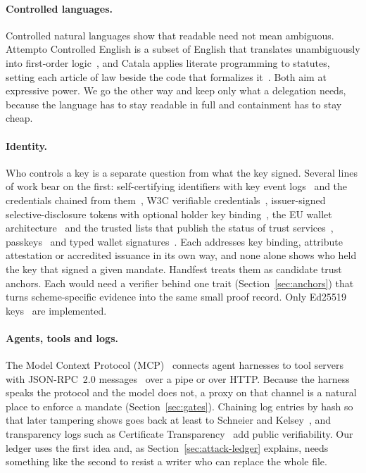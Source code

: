 \documentclass[10pt,twocolumn]{article}
\theoremstyle{plain}
\theoremstyle{definition}
\begin{document}
\paragraph{Controlled languages.}
Controlled natural languages show that readable need not mean ambiguous. Attempto Controlled English is a subset of English that translates unambiguously into first-order logic~\cite{fuchs2008ace}, and Catala applies literate programming to statutes, setting each article of law beside the code that formalizes it~\cite{merigoux2021catala}. Both aim at expressive power. We go the other way and keep only what a delegation needs, because the language has to stay readable in full and containment has to stay cheap.

\paragraph{Identity.}
Who controls a key is a separate question from what the key signed. Several lines of work bear on the first: self-certifying identifiers with key event logs~\cite{smith2019keri} and the credentials chained from them~\cite{acdc}, W3C verifiable credentials~\cite{w3c2025vcdm}, issuer-signed selective-disclosure tokens with optional holder key binding~\cite{rfc9901,terbu2026sdjwtvc}, the EU wallet architecture~\cite{eudi_arf} and the trusted lists that publish the status of trust services~\cite{etsi2025tl}, passkeys~\cite{w3c2021webauthn} and typed wallet signatures~\cite{eip712}. Each addresses key binding, attribute attestation or accredited issuance in its own way, and none alone shows who held the key that signed a given mandate. Handfest treats them as candidate trust anchors. Each would need a verifier behind one trait (Section~\ref{sec:anchors}) that turns scheme-specific evidence into the same small proof record. Only Ed25519 keys~\cite{rfc8032} are implemented.

\paragraph{Agents, tools and logs.}
The Model Context Protocol (MCP)~\cite{mcp2025spec} connects agent harnesses to tool servers with JSON-RPC~2.0 messages~\cite{jsonrpc2} over a pipe or over HTTP. Because the harness speaks the protocol and the model does not, a proxy on that channel is a natural place to enforce a mandate (Section~\ref{sec:gates}). Chaining log entries by hash so that later tampering shows goes back at least to Schneier and Kelsey~\cite{schneier1999audit}, and transparency logs such as Certificate Transparency~\cite{rfc6962} add public verifiability. Our ledger uses the first idea and, as Section~\ref{sec:attack-ledger} explains, needs something like the second to resist a writer who can replace the whole file.
\end{document}
